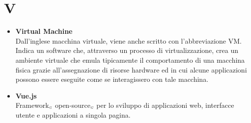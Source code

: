 \chapter{V} \label{V}
\begin{itemize}
	\item \textbf{Virtual Machine}\\
	Dall'inglese macchina virtuale, viene anche scritto con l'abbreviazione VM. Indica un software che, attraverso un processo di virtualizzazione, crea un ambiente virtuale che emula tipicamente il comportamento di una macchina fisica grazie all'assegnazione di risorse hardware ed in cui alcune applicazioni possono essere eseguite come se interagissero con tale macchina.
	
	\item \textbf{Vue.js}\\
	Framework$_{\scaleto{G}{3pt}}$ open-source$_{\scaleto{G}{3pt}}$ per lo sviluppo di applicazioni web, interfacce utente e applicazioni a singola pagina.
\end{itemize}